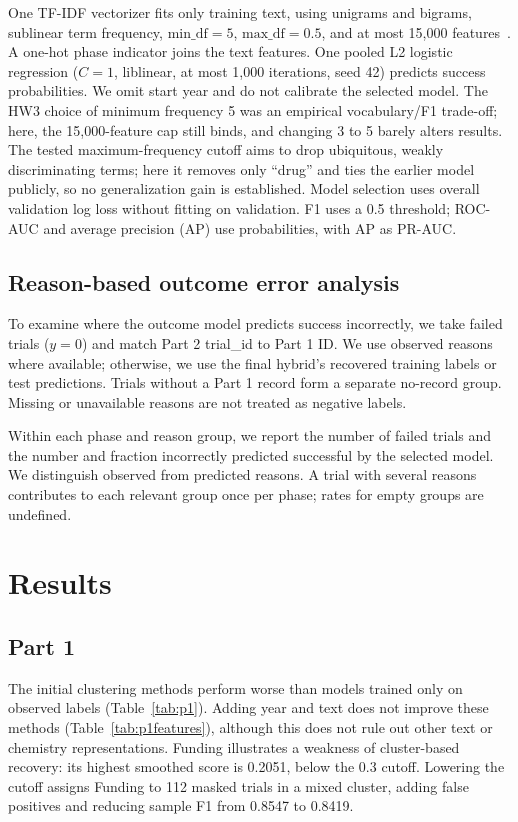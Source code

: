 \documentclass[10pt,twocolumn,letterpaper]{article}
\begin{document}
One TF-IDF vectorizer fits only training text, using unigrams and bigrams,
sublinear term frequency, $\mathrm{min\_df}=5$, $\mathrm{max\_df}=0.5$, and at
most 15,000 features~\cite{tfidf}. A one-hot phase indicator joins the text
features. One pooled L2 logistic regression ($C=1$, liblinear, at most 1,000
iterations, seed 42) predicts success probabilities. We omit start year and do
not calibrate the selected model. The HW3 choice of minimum frequency 5 was an
empirical vocabulary/F1 trade-off; here, the 15,000-feature cap still binds,
and changing 3 to 5 barely alters results. The tested maximum-frequency cutoff
aims to drop ubiquitous, weakly discriminating terms; here it removes only
``drug'' and ties the earlier model publicly, so no generalization gain is
established. Model selection uses overall
validation log loss without fitting on validation. F1 uses a 0.5 threshold;
ROC-AUC and average precision (AP) use probabilities, with AP as PR-AUC.

\subsection{Reason-based outcome error analysis}
To examine where the outcome model predicts success incorrectly, we take failed
trials ($y=0$) and match Part 2 trial\_id to Part 1 ID. We use observed reasons
where available; otherwise, we use the final hybrid's recovered training labels
or test predictions. Trials without a Part 1 record form a separate no-record
group. Missing or unavailable reasons are not treated as negative labels.

Within each phase and reason group, we report the number of failed trials and
the number and fraction incorrectly predicted successful by the selected model.
We distinguish observed from predicted reasons.
A trial with several reasons contributes to each relevant group once per phase;
rates for empty groups are undefined.

\section{Results}
\subsection{Part 1}
\begin{table}[t]
\centering\small

\caption{Initial Part 1 validation F1 by reason and method.}
\label{tab:p1}
\end{table}
The initial clustering methods perform worse than models trained only on
observed labels (Table~\ref{tab:p1}). Adding year and text does not improve these
methods (Table~\ref{tab:p1features}), although this does not rule out other text
or chemistry representations. Funding illustrates a weakness of cluster-based
recovery: its highest smoothed score is 0.2051, below the 0.3 cutoff. Lowering
the cutoff assigns Funding to 112 masked trials in a mixed cluster, adding
false positives and reducing sample F1 from 0.8547 to 0.8419.
\end{document}
